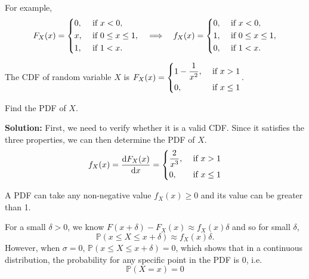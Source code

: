 For example, 
\[
    F_X(x) = \begin{dcases}
        0, &\text{ if } x < 0 ,\\
        x, &\text{ if } 0 \leq  x \leq 1 ,\\
        1, &\text{ if } 1 < x.
    \end{dcases}
    \quad\Longrightarrow\quad 
    f_X(x) = \begin{dcases}
        0, &\text{ if } x < 0 ,\\
        1, &\text{ if } 0 \leq x \leq 1 ,\\
        0, &\text{ if } 1 < x.
    \end{dcases}
\]

\begin{eg}
    The CDF of random variable \(X\) is \(F_X(x) = \begin{dcases}
        1 - \frac{1}{x^2}, &\text{ if } x > 1 \\
        0, &\text{ if } x \leq 1 
    \end{dcases}\). 
    
    Find the PDF of \(X\).

    \textbf{Solution:} 
    First, we need to verify whether it is a valid CDF. Since it satisfies the three properties, we can then determine the PDF of \(X\).
    \[
        f_X(x) = \frac{\mathrm{d}F_X(x)}{\mathrm{d}x} = \begin{dcases}
            \dfrac{2}{x^3}, &\text{ if } x > 1 \\
            0 , &\text{ if } x \leq 1 
        \end{dcases}
    \] 
\end{eg}
\begin{remark}
    A PDF can take any non-negative value \(f_X(x) \geq 0\) and its value can be greater than 1.
\end{remark}

For a small \(\delta > 0\), we know \(F(x + \delta) - F_X(x) \approx f_X (x)\delta\) and so for small \(\delta \), 
\[
    \mathbb{P}(x \leq X \leq x + \delta) \approx f_X(x)\delta. 
\]
However, when \(\sigma = 0\), \(\mathbb{P}(x \leq X \leq x + \delta) = 0\), which shows that in a continuous distribution, the probability for any specific point in the PDF is 0, i.e. 
\[
    \mathbb{P}(X = x) = 0
\]

\begin{minipage}{0.5\textwidth}
    \centering
    
\end{minipage}
\begin{minipage}{0.5\textwidth}
    \centering
    
\end{minipage}

